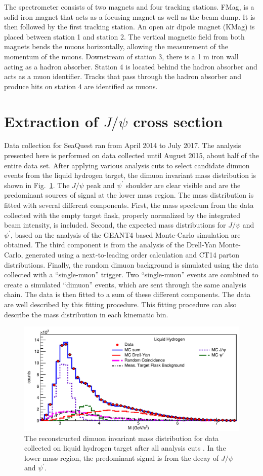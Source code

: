 \documentclass[10pt,a4paper,final]{article}
\begin{document}
The spectrometer consists of two magnets and four tracking stations. FMag, is a
solid iron magnet that acts as a focusing magnet as well as the beam dump. It is
then followed by the first tracking station. An open air dipole magnet (KMag) is
placed between station 1 and station 2. The vertical magnetic field from both
magnets bends the muons horizontally, allowing the measurement of the momentum
of the muons. Downstream of station 3, there is a 1 m iron wall acting as a
hadron absorber. Station 4 is located behind the hadron absorber and acts as a
muon identifier. Tracks that pass through the hadron absorber and
produce hits on station 4 are identified as  muons.

\section{Extraction of \texorpdfstring{$J/\psi$}{J/psi} cross section}
\label{sec:result}
Data collection for SeaQuest ran from April 2014 to July 2017. The analysis
presented here is performed on data collected until August 2015, about half
of the entire data set. After applying various analysis cuts to select
candidate dimuon events from the liquid hydrogen target, the dimuon invariant
mass distribution is shown in Fig.~\ref{fig:mass}. The $J/\psi$ peak and $\psi^\prime$
shoulder are clear visible and are the predominant sources of signal at the
lower mass region. The mass distribution is fitted with several different
components. First, the mass spectrum from the data collected with the
empty target flask, properly normalized by the integrated beam intensity,
is included. Second, the expected mass distributions for $J/\psi$ and
$\psi^\prime$, based on the analysis of the GEANT4 based Monte-Carlo
simulation are obtained.
The third component is from the analysis of the Drell-Yan
Monte-Carlo, generated using a next-to-leading order calculation and CT14 parton
distributions. Finally, the random dimuon background is simulated 
using the data collected with a ``single-muon'' trigger. Two ``single-muon''
events are combined to create a simulated ``dimuon'' events, which are sent
through the same analysis chain. The data is then fitted to a sum of these
different components. The data are well described by this fitting procedure.
This fitting procedure can also describe the mass distribution in each kinematic bin.

\begin{figure}[h!]
	\centering
	\includegraphics[width=0.65\linewidth]{extFig3_LH2}
	\caption{The reconstructed dimuon invariant mass distribution for data collected on
		liquid hydrogen target after all analysis cuts \cite{dove2021}.
		In the lower mass region, the predominant signal is from the decay
		of $J/\psi$ and $\psi^\prime$. }
	\label{fig:mass}
\end{figure}
\end{document}
